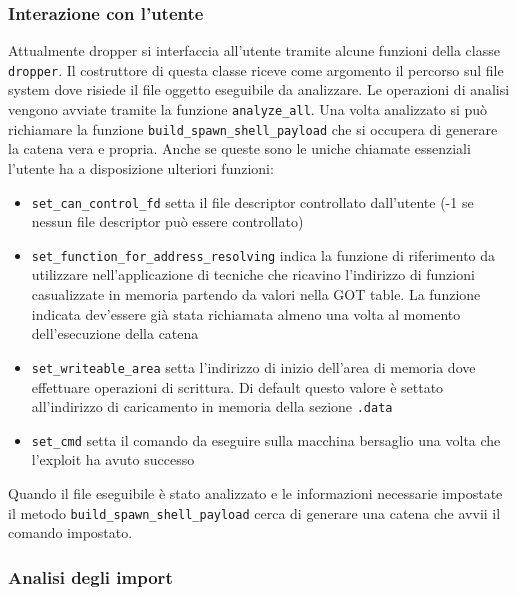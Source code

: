 \subsubsection{Interazione con l'utente}

Attualmente dropper si interfaccia all'utente tramite alcune funzioni
della classe \lstinline{dropper}. Il costruttore di questa classe
riceve come argomento il percorso sul file system dove risiede il file
oggetto eseguibile da analizzare. Le operazioni di analisi vengono
avviate tramite la funzione \lstinline{analyze_all}. Una volta
analizzato si può richiamare la funzione
\lstinline{build_spawn_shell_payload} che si occupera di generare la
catena vera e propria. Anche se queste sono le uniche chiamate
essenziali l'utente ha a disposizione ulteriori funzioni:
\begin{itemize}

\item \lstinline{set_can_control_fd} setta il file descriptor
  controllato dall'utente (-1 se nessun file descriptor può essere
  controllato)

\item \lstinline{set_function_for_address_resolving} indica la
  funzione di riferimento da utilizzare nell'applicazione di tecniche
  che ricavino l'indirizzo di funzioni casualizzate in memoria
  partendo da valori nella GOT table. La funzione indicata dev'essere
  già stata richiamata almeno una volta al momento dell'esecuzione
  della catena

\item \lstinline{set_writeable_area} setta l'indirizzo di inizio
  dell'area di memoria dove effettuare operazioni di scrittura. Di
  default questo valore è settato all'indirizzo di caricamento in
  memoria della sezione \lstinline{.data}

\item \lstinline{set_cmd} setta il comando da eseguire sulla macchina
  bersaglio una volta che l'exploit ha avuto successo

\end{itemize}

Quando il file eseguibile è stato analizzato e le informazioni
necessarie impostate il metodo \lstinline{build_spawn_shell_payload}
cerca di generare una catena che avvii il comando impostato.

\subsubsection{Analisi degli import}


